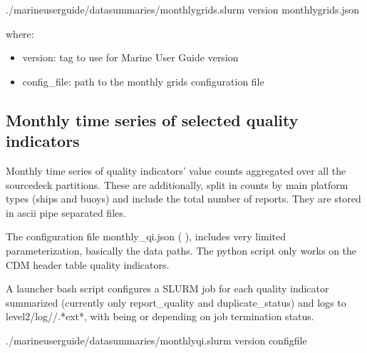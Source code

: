 \documentclass[letterpaper,10pt,english]{sphinxmanual}
\begin{document}
\begin{sphinxVerbatim}[commandchars=\\\{\}]
./marine\PYGZhy{}user\PYGZhy{}guide/data\PYGZus{}summaries/monthly\PYGZus{}grids.slurm version monthly\PYGZus{}grids.json
\end{sphinxVerbatim}

where:
\begin{itemize}
\item {} 
version: tag to use for Marine User Guide version

\item {} 
config\_file: path to the monthly grids configuration file

\end{itemize}


\subsection{Monthly time series of selected quality indicators}
\label{\detokenize{index:monthly-time-series-of-selected-quality-indicators}}\label{\detokenize{index:qi-counts-um-section}}
Monthly time series of quality indicators’ value counts aggregated over all the
source\sphinxhyphen{}deck partitions. These are additionally, split in counts by main
platform types (ships and buoys) and include the total number of reports. They
are stored in ascii pipe separated files.

The configuration file monthly\_qi.json ( {\hyperref[\detokenize{index:qi-counts-um}]{}}), includes very
limited parameterization, basically the data paths. The python script only works
on the CDM header table quality indicators.

A launcher bash script configures a SLURM job for each quality indicator
summarized (currently only report\_quality and duplicate\_status) and logs to
level2/log//\sphinxhyphen{}.*ext*, with  being  or
 depending on job termination status.

\begin{sphinxVerbatim}[commandchars=\\\{\}]
./marine\PYGZhy{}user\PYGZhy{}guide/data\PYGZus{}summaries/monthly\PYGZus{}qi.slurm version config\PYGZus{}file
\end{sphinxVerbatim}
\end{document}
